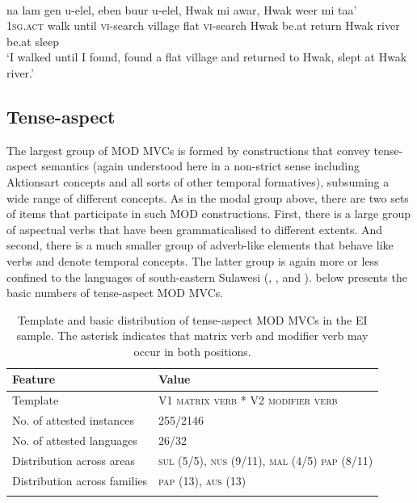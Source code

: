 \ea \label{Klon_99b}
\\
\gll na lam gen u-elel, eben buur u-elel, Hwak mi awar, Hwak weer mi taa' \\
1\textsc{sg}.\textsc{act} walk until \textsc{vi}-search village flat \textsc{vi}-search Hwak be.at return Hwak river be.at sleep \\
\glft `I walked until I found, found a flat village and returned to Hwak, slept at Hwak river.'\\ 
\z

\subsection{Tense-aspect}

The largest group of MOD MVCs is formed by constructions that convey tense-aspect semantics (again understood here in a non-strict sense including Aktionsart concepts and all sorts of other temporal formatives), subsuming a wide range of different concepts. As in the modal group above, there are two sets of items that participate in such MOD constructions. First, there is a large group of aspectual verbs that have been grammaticalised to different extents. And second, there is a much smaller group of adverb-like elements that behave like verbs and denote temporal concepts. The latter group is again more or less confined to the languages of south-eastern Sulawesi (, , and ).  below presents the basic numbers of tense-aspect MOD MVCs.

\begin{table}
\begin{tabular}{ll}
\lsptoprule
Feature&Value\tabularnewline
\midrule
Template&V1 \textsc{matrix verb} * V2 \textsc{modifier verb}\tabularnewline
No. of attested instances& 255/2146 \tabularnewline
No. of attested languages& 26/32 \tabularnewline
Distribution across areas& \textsc{sul} (5/5), \textsc{nus} (9/11), \textsc{mal} (4/5) \textsc{pap} (8/11) \tabularnewline
Distribution across families& \textsc{pap} (13), \textsc{aus} (13) \tabularnewline
\lspbottomrule
\end{tabular}
\caption[Template and basic distribution of tense-aspect MOD MVCs]{Template and basic distribution of tense-aspect MOD MVCs in the EI sample. The asterisk indicates that matrix verb and modifier verb may occur in both positions.}
\label{table:tense-aspect}
\end{table}

